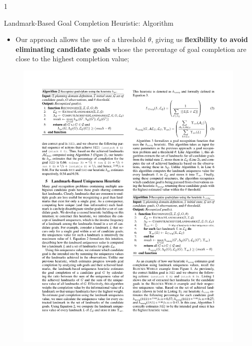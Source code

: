 \documentclass{beamer}
\def\masterclass{1}
\begin{document}
\if\masterclass1
    \begin{frame}{Landmark-Based Goal Completion Heuristic: Algorithm}
		\begin{itemize}
			\item Our approach allows the use of a threshold $\theta$, giving us \textbf{flexibility to avoid eliminating candidate goals} whose the percentage of goal completion are close to the highest completion value;
		\end{itemize}
		
		\begin{figure}[here]
			\centering
			\includegraphics[width=0.8\linewidth]{algo2-heuristic_goalcompletion.pdf}
		\end{figure}	
	\end{frame}	
\fi

\end{document}
